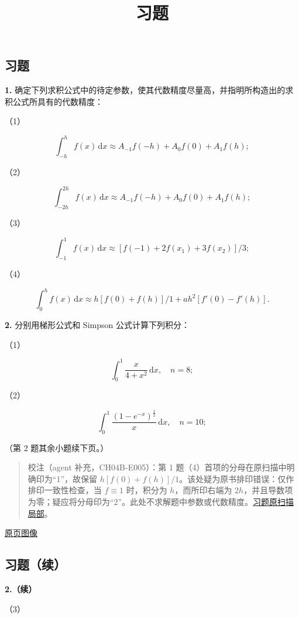 \documentclass[
  10pt,
  fontset=fandol]{ctexart}
\title{习题}
\author{}
\date{}
\begin{document}
\maketitle

\subsection{习题}\label{ux4e60ux9898}

\textbf{1.} 确定下列求积公式中的待定参数，使其代数精度尽量高，并指明所构造出的求积公式所具有的代数精度：

（1）

\[
\int_{-h}^{h}f(x)\,\mathrm{d}x\approx A_{-1}f(-h)+A_0f(0)+A_1f(h);
\]

（2）

\[
\int_{-2h}^{2h}f(x)\,\mathrm{d}x\approx A_{-1}f(-h)+A_0f(0)+A_1f(h);
\]

（3）

\[
\int_{-1}^{1}f(x)\,\mathrm{d}x\approx[f(-1)+2f(x_1)+3f(x_2)]/3;
\]

（4）

\[
\int_0^h f(x)\,\mathrm{d}x\approx h[f(0)+f(h)]/1+ah^2[f'(0)-f'(h)].
\]

\textbf{2.} 分别用梯形公式和 Simpson 公式计算下列积分：

（1）

\[
\int_0^1\frac{x}{4+x^2}\,\mathrm{d}x,\quad n=8;
\]

（2）

\[
\int_0^1\frac{(1-e^{-x})^{\frac12}}{x}\,\mathrm{d}x,\quad n=10;
\]

（第 2 题其余小题续下页。）

\begin{quote}
校注（agent 补充，CH04B-E005）：第 1 题（4）首项的分母在原扫描中明确印为``1''，故保留 \(h[f(0)+f(h)]/1\)。该处疑为原书排印错误：仅作排印一致性检查，当 \(f\equiv1\) 时，积分为 \(h\)，而所印右端为 \(2h\)，并且导数项为零；疑应将分母印为``2''。此处不求解题中参数或代数精度。\href{../assets/ch04b/review-p117-exercises.png}{习题原扫描局部}。
\end{quote}

\href{../../source-images/pdf-118.jpeg}{原页图像}

\subsection{习题（续）}\label{ux4e60ux9898ux7eed}

\textbf{2.（续）}

（3）
\end{document}
